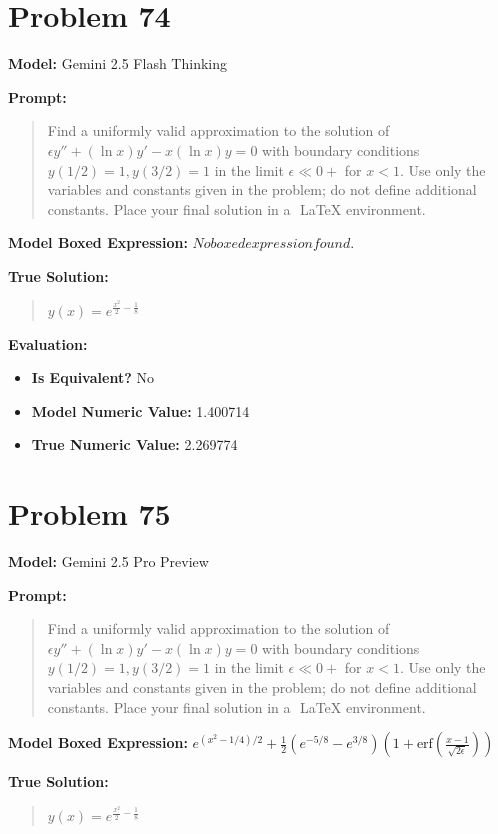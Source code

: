 \documentclass{article}
\begin{document}
{\section*{Problem 74}
\textbf{Model:} Gemini 2.5 Flash Thinking

\textbf{Prompt:}
\begin{quote}
Find a uniformly valid approximation to the solution of $\epsilon y'' + (\ln x) y' - x(\ln x) y = 0$ with boundary conditions $y(1/2)=1, y(3/2)=1$ in the limit $\epsilon \ll 0+$ for $x<1$. Use only the variables and constants given in the problem; do not define additional constants. Place your final solution in a $\boxed{}$ LaTeX environment.
\end{quote}
\textbf{Model Boxed Expression:} $No boxed expression found.$

\textbf{True Solution:}
\begin{quote}
$y(x) = e^{\frac{x^2}{2} - \frac{1}{8}}$
\end{quote}

\textbf{Evaluation:}
\begin{itemize}
\item \textbf{Is Equivalent?} No
\item \textbf{Model Numeric Value:} 1.400714
\item \textbf{True Numeric Value:} 2.269774
\end{itemize}
\vspace{1cm}
\section*{Problem 75}
\textbf{Model:} Gemini 2.5 Pro Preview

\textbf{Prompt:}
\begin{quote}
Find a uniformly valid approximation to the solution of $\epsilon y'' + (\ln x) y' - x(\ln x) y = 0$ with boundary conditions $y(1/2)=1, y(3/2)=1$ in the limit $\epsilon \ll 0+$ for $x<1$. Use only the variables and constants given in the problem; do not define additional constants. Place your final solution in a $\boxed{}$ LaTeX environment.
\end{quote}
\textbf{Model Boxed Expression:} $e^{(x^2-1/4)/2} + \frac{1}{2}(e^{-5/8}-e^{3/8})\left(1 + \text{erf}\left(\frac{x-1}{\sqrt{2\epsilon}}\right)\right)$

\textbf{True Solution:}
\begin{quote}
$y(x) = e^{\frac{x^2}{2} - \frac{1}{8}}$
\end{quote}

}
\end{document}
